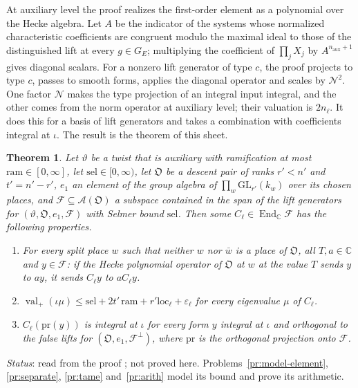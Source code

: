 \documentclass[reqno]{amsart}
\theoremstyle{definition}
\theoremstyle{plain}
\newtheorem{theorem}{Theorem}[section]
\newcommand{\C}{\mathbb{C}}
\newcommand{\val}{\operatorname{val}}
\newcommand{\GL}{\mathrm{GL}}
\newcommand{\DP}{\mathfrak{O}}
\newcommand{\loc}{\mathrm{loc}}
\begin{document}
At auxiliary level the proof realizes the first-order element as a polynomial over the Hecke algebra.  Let \(A\) be the indicator of the systems whose normalized characteristic coefficients are congruent modulo the maximal ideal to those of the distinguished lift at every \(g \in G_E\); multiplying the coefficient of \(\prod_j X_j\) by \(A^{n_{\mathrm{aux}} + 1}\) gives diagonal scalars.  For a nonzero lift generator of type \(c\), the proof projects to type \(c\), passes to smooth forms, applies the diagonal operator and scales by \(\mathcal N^2\).  One factor \(\mathcal N\) makes the type projection of an integral input integral, and the other comes from the norm operator at auxiliary level; their valuation is \(2n_\ell\).  It does this for a basis of lift generators and takes a combination with coefficients integral at \(\iota\).  The result is the theorem of this sheet.

\begin{theorem}\label{thm:eigenvalues}
Let \(\vartheta\) be a twist that is auxiliary with ramification at most \(\mathrm{ram} \in [0, \infty]\), let \(\mathrm{sel} \in [0, \infty)\), let \(\DP\) be a descent pair of ranks \(r' < n'\) and \(t' = n' - r'\), \(e_1\) an element of the group algebra of \(\prod_w \GL_{r'}(k_w)\) over its chosen places, and \(\mathcal F \subseteq \mathcal A(\DP)\) a subspace contained in the span of the lift generators for \((\vartheta, \DP, e_1, \mathcal F)\) with Selmer bound \(\mathrm{sel}\).  Then some \(C_\ell \in \operatorname{End}_{\C} \mathcal F\) has the following properties.
\begin{enumerate}
\item[(a)] For every split place \(w\) such that neither \(w\) nor \(\bar w\) is a place of \(\DP\), all \(T, a \in \C\) and \(y \in \mathcal F\): if the Hecke polynomial operator of \(\DP\) at \(w\) at the value \(T\) sends \(y\) to \(ay\), it sends \(C_\ell y\) to \(aC_\ell y\).
\item[(b)] \(\val_+(\iota\mu) \le \mathrm{sel} + 2t'\,\mathrm{ram} + r'\loc_\ell + \varepsilon_\ell\) for every eigenvalue \(\mu\) of \(C_\ell\).
\item[(c)] \(C_\ell(\mathrm{pr}(y))\) is integral at \(\iota\) for every form \(y\) integral at \(\iota\) and orthogonal to the false lifts for \((\DP, e_1, \mathcal F^\perp)\), where \(\mathrm{pr}\) is the orthogonal projection onto \(\mathcal F\).
\end{enumerate}
\end{theorem}

\emph{Status}: read from the proof \cite{GL}; not proved here.  Problems~\ref{pr:model-element}, \ref{pr:separate}, \ref{pr:tame} and~\ref{pr:arith} model its bound and prove its arithmetic.
\end{document}
